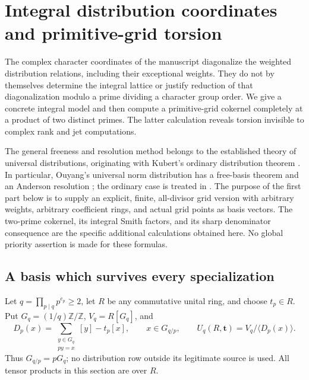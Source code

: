 \section{Integral distribution coordinates and primitive-grid torsion}
\label{intdist:sec:main}

The complex character coordinates of the manuscript diagonalize the
weighted distribution relations, including their exceptional weights.
They do not by themselves determine the integral lattice or justify
reduction of that diagonalization modulo a prime dividing a character
group order. We give a concrete integral model and then compute a
primitive-grid cokernel completely at a product of two distinct primes.
The latter calculation reveals torsion invisible to complex rank and
jet computations.

The general freeness and resolution method belongs to the established
theory of universal distributions, originating with Kubert's ordinary
distribution theorem \cite{intdist:Kubert1979}. In particular, Ouyang's universal
norm distribution has a free-basis theorem and an Anderson resolution
\cite[Proposition 4.2 and Theorem 5.1]{intdist:Ouyang2002}; the ordinary
case is treated in \cite{intdist:Ouyang2001}. The purpose of the first
part below is to supply an explicit, finite, all-divisor grid version
with arbitrary weights, arbitrary coefficient rings, and actual grid
points as basis vectors. The two-prime cokernel, its integral Smith
factors, and its sharp denominator consequence are the specific
additional calculations obtained here. No global priority assertion is
made for these formulas.

\subsection{A basis which survives every specialization}

Let $q=\prod_{p\mid q}p^{e_p}\ge2$, let $R$ be any commutative unital
ring, and choose $t_p\in R$. Put $G_q=(1/q)\mathbb Z/\mathbb Z$,
$V_q=R[G_q]$, and
\[
 D_p(x)=\sum_{\substack{y\in G_q\\py=x}}[y]-t_p[x],
 \qquad x\in G_{q/p},\qquad
 U_q(R,\mathbf t)=V_q/\langle D_p(x)\rangle.
\]
Thus $G_{q/p}=pG_q$; no distribution row outside its legitimate source
is used. All tensor products in this section are over $R$.

